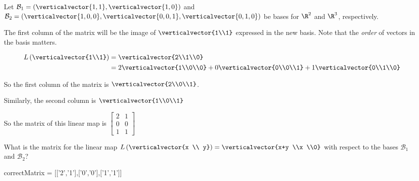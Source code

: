 \documentclass{ximera}
\begin{document}
\begin{problem}
	Let $\mathcal{B}_1 = \left(\verticalvector{1,1},\verticalvector{1,0}\right)$ and $\mathcal{B}_2 = \left(\verticalvector{1,0,0},\verticalvector{0,0,1},\verticalvector{0,1,0}\right)$ be bases
	for $\R^2$ and $\R^3$, respectively. 

	\begin{solution}
	\begin{hint}
		The first column of the matrix will be the image of $\verticalvector{1\\1}$ expressed in the new basis.  Note that the \textit{order} of vectors in the basis matters.
	\end{hint}
	\begin{hint}
		\begin{align*}
			L\left(\verticalvector{1\\1}\right) &= \verticalvector{2\\1\\0}\\
				&= 2\verticalvector{1\\0\\0}+0\verticalvector{0\\0\\1}+1\verticalvector{0\\1\\0}\\
		\end{align*}
	\end{hint}
	\begin{hint}
		So the first column of the matrix is $\verticalvector{2\\0\\1}$.
	\end{hint}
	\begin{hint}
		Similarly, the second column is $\verticalvector{1\\0\\1}$
	\end{hint}
	\begin{hint}
		So the matrix of this linear map is \(\begin{bmatrix} 2 & 1 \\0& 0\\ 1 & 1\end{bmatrix}\)
	\end{hint}
        What is the matrix for the linear map $L\left(\verticalvector{x \\ y}\right) = \verticalvector{x+y \\x \\0}$ with respect to the 
         bases $\mathcal{B}_1$  and $\mathcal{B}_2$?
	\begin{matrix-answer}
          correctMatrix = [['2','1'],['0','0'],['1','1']]
	\end{matrix-answer}
	\end{solution}
\end{problem}
\end{document}
